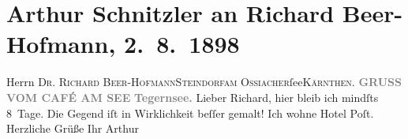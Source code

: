 

         
         \renewcommand{\erwaehntePersonen}{Personen: Richard Beer-Hofmann}
         \renewcommand{\erwaehnteOrte}{Orte: Café am See, Hotel Post, Kärnten, Ossiacher See, Steindorf am Ossiacher See, Tegernsee}
         \renewcommand{\erwaehnteWerke}{}
               \section[Arthur Schnitzler an Richard Beer-Hofmann, 2. 8. 1898]{ Arthur Schnitzler an Richard Beer-Hofmann, 2. 8. 1898}\nopagebreak{}\rehead{ }\begin{ledgroupsized}[t]{13cm}\normalsize\beginnumbering \toendnotes[C]{\smallbreak\pagebreak[2]} 
\toendnotes[C]{\smallbreak}\pstart{}{\pb}Herrn \textsc{Dr. Richard
                     Beer-Hofmann}\pend{}\pstart{}\textsc{Steindorf}\pend{}\pstart{}\textsc{am Ossiacher}ſee\pend{}\pstart{}\textsc{Kärnthen}.\pend{}{\bigskip}\pstart
           \noindent{}\centering{}{\pb}\textcolor{gray}{\textbf{GRUSS VOM CAFÉ AM SEE}}\pend
           \pstart
           \noindent{}\centering{}\textcolor{gray}{\textbf{Tegernsee.}}\pend
           \pstart
           Lieber Richard,{ }hier bleib ich mindſts
               8 Tage. Die Gegend iſt in Wirklichkeit beſſer gemalt! Ich wohne Hotel Poſt.\pend
           \pstart Herzliche Grüße Ihr \spacefill\mbox{Arthur}\pend{}
         
         \endnumbering{}\end{ledgroupsized}  \newcommand{\dateiname}{L00828}\newcommand{\titel}{Arthur Schnitzler an Richard Beer-Hofmann, 2. 8. 1898}\newcommand{\editorInnen}{Martin Anton Müller und Gerd-Hermann Susen}
      